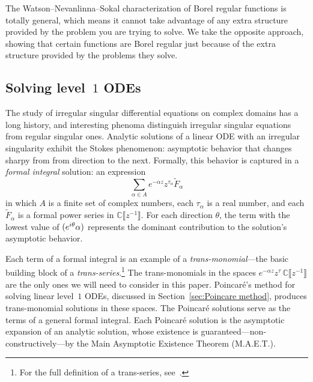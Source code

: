 \documentclass{article}
\let\Re\relax
\DeclareMathOperator{\Re}{Re}
\newcommand{\C}{\mathbb{C}}
\newcommand{\series}[1]{\tilde{#1}}
\newcommand*{\defeq}{\mathrel{\vcenter{\baselineskip0.5ex \lineskiplimit0pt
                     \hbox{\scriptsize.}\hbox{\scriptsize.}}}%
                     =}
\newcommand{\borel}{\mathcal{B}}
\theoremstyle{definition}
\theoremstyle{plain}
\begin{document}
The Watson--Nevanlinna--Sokal characterization of Borel regular functions is totally general, which means it cannot  take advantage of any extra structure provided by the problem you are trying to solve. We take the opposite approach, showing that certain functions are Borel regular just because of the extra structure provided by the problems they solve. 

\subsection{Solving level~$1$ ODEs}\label{sec:history_ODE}
%
The study of irregular singular differential equations on complex domains has a long history, and interesting phenoma distinguish irregular singular equations from regular singular ones. Analytic solutions of a linear ODE with an irregular singularity exhibit the Stokes phenomenon: asymptotic behavior that changes sharpy from from direction to the next. Formally, this behavior is captured in a {\em formal integral} solution: an expression
\[ \sum_{\alpha \in A} e^{-\alpha z} z^{\tau_\alpha} \series{F}_\alpha \]
in which $A$ is a finite set of complex numbers, each $\tau_\alpha$ is a real number, and each $\series{F}_\alpha$ is a formal power series in $\C\llbracket z^{-1} \rrbracket$. For each direction $\theta$, the term with the lowest value of $\Re(e^{i\theta} \alpha)$ represents the dominant contribution to the solution's asymptotic behavior.

Each term of a formal integral is an example of a {\em trans-monomial}---the basic building block of a {\em trans-series}.\footnote{For the full definition of a trans-series, see~\cite{EcalleIII,van-der-hoeven2001complex,costin_transseries,costin_summability}.} The trans-monomials in the spaces $e^{-\alpha z} z^\tau\,\C\llbracket z^{-1} \rrbracket$ are the only ones we will need to consider in this paper. Poincar\'{e}'s method for solving linear level~$1$ ODEs, discussed in Section~\ref{sec:Poincare method}, produces trans-monomial solutions in these spaces. The Poincar\'{e} solutions serve as the terms of a general formal integral. Each Poincar\'{e} solution is the asymptotic expansion of an analytic solution, whose existence is guaranteed---non-constructively---by the Main Asymptotic Existence Theorem (M.A.E.T.).
\end{document}
